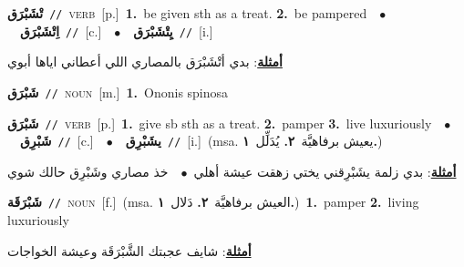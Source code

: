\documentclass[10pt,a4paper,twoside]{article} %
\begin{document}
\begin{multicols}{2}
{\setlength\topsep{0pt}\textbf{\foreignlanguage{arabic}{تْشَبْرَق}}\ {\color{gray}\texttt{//}\color{black}}\ \textsc{verb}\ [p.]\ \textbf{1.}~be given sth as a treat.  \textbf{2.}~be pampered\ \ $\bullet$\ \ \setlength\topsep{0pt}\textbf{\foreignlanguage{arabic}{اِتْشَبْرَق}}\ {\color{gray}\texttt{//}\color{black}}\ [c.]\ \ $\bullet$\ \ \setlength\topsep{0pt}\textbf{\foreignlanguage{arabic}{يِتْشَبْرَق}}\ {\color{gray}\texttt{//}\color{black}}\ [i.]\  \begin{flushright}\color{gray}\foreignlanguage{arabic}{\textbf{\underline{\foreignlanguage{arabic}{أمثلة}}}: بدي أتْشَبْرَق بالمصاري اللي أعطاني اياها أبوي}\end{flushright}\color{black}} \vspace{2mm}

{\setlength\topsep{0pt}\textbf{\foreignlanguage{arabic}{شَبْرَق}}\ {\color{gray}\texttt{//}\color{black}}\ \textsc{noun}\ [m.]\ \textbf{1.}~Ononis spinosa\ } \vspace{2mm}

{\setlength\topsep{0pt}\textbf{\foreignlanguage{arabic}{شَبْرَق}}\ {\color{gray}\texttt{//}\color{black}}\ \textsc{verb}\ [p.]\ \textbf{1.}~give sb sth as a treat.  \textbf{2.}~pamper  \textbf{3.}~live luxuriously\ \ $\bullet$\ \ \setlength\topsep{0pt}\textbf{\foreignlanguage{arabic}{شَبْرِق}}\ {\color{gray}\texttt{//}\color{black}}\ [c.]\ \ $\bullet$\ \ \setlength\topsep{0pt}\textbf{\foreignlanguage{arabic}{يشَبْرِق}}\ {\color{gray}\texttt{//}\color{black}}\ [i.]\ \color{gray}(msa. \foreignlanguage{arabic}{يعيش برفاهيَّة}~\foreignlanguage{arabic}{\textbf{٢.}}  \foreignlanguage{arabic}{يُدَلِّل}~\foreignlanguage{arabic}{\textbf{١.}})\color{black}\  \begin{flushright}\color{gray}\foreignlanguage{arabic}{\textbf{\underline{\foreignlanguage{arabic}{أمثلة}}}: بدي زلمة يشَبْرِقني يختي زهقت عيشة أهلي\ $\bullet$\ \  خذ مصاري وشَبْرِق حالك شوي}\end{flushright}\color{black}} \vspace{2mm}

{\setlength\topsep{0pt}\textbf{\foreignlanguage{arabic}{شَبْرَقَة}}\ {\color{gray}\texttt{//}\color{black}}\ \textsc{noun}\ [f.]\ \color{gray}(msa. \foreignlanguage{arabic}{العيش برفاهيَّة}~\foreignlanguage{arabic}{\textbf{٢.}}  \foreignlanguage{arabic}{دَلال}~\foreignlanguage{arabic}{\textbf{١.}})\color{black}\ \textbf{1.}~pamper  \textbf{2.}~living luxuriously\  \begin{flushright}\color{gray}\foreignlanguage{arabic}{\textbf{\underline{\foreignlanguage{arabic}{أمثلة}}}: شايف عجبتك الشَّبْرَقَة وعيشة الخواجات}\end{flushright}\color{black}} \vspace{2mm}


\end{multicols}
\end{document}
